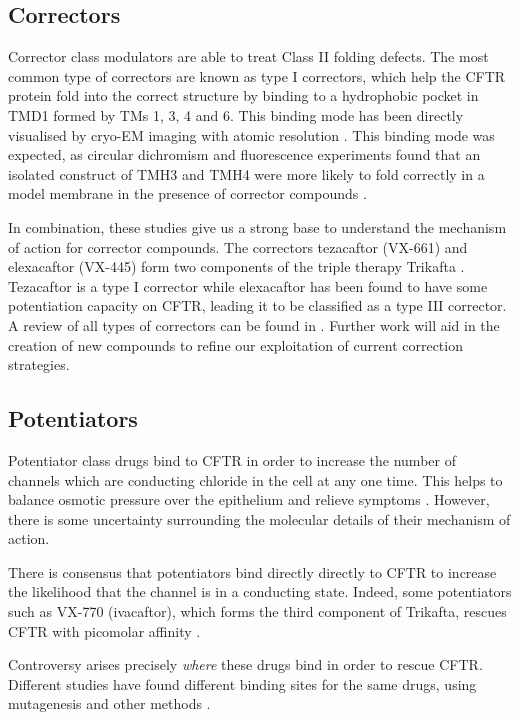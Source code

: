 \subsection{Correctors}
Corrector class modulators are able to treat Class II folding defects. The most common type of correctors are known as type I correctors, which help the CFTR protein fold into the correct structure by binding to a hydrophobic pocket in TMD1 formed by TMs 1, 3, 4 and 6. This binding mode has been directly visualised by cryo-EM imaging with atomic resolution \cite{fiedorczuk2022}. This binding mode was expected, as circular dichromism \cite{greenfield2006} and fluorescence experiments found that an isolated construct of TMH3 and TMH4 were more likely to fold correctly in a model membrane in the presence of corrector compounds \cite{krainer2018}. 

In combination, these studies give us a strong base to understand the mechanism of action for corrector compounds. The correctors tezacaftor (VX-661) and elexacaftor (VX-445) form two components of the triple therapy Trikafta \cite{administration2021, trikafta_website}. Tezacaftor is a type I corrector while elexacaftor has been found to have some potentiation capacity on CFTR, leading it to be classified as a type III corrector. A review of all types of correctors can be found in \cite{veit2018}. Further work will aid in the creation of new compounds to refine our exploitation of current correction strategies.

\subsection{Potentiators}
Potentiator class drugs bind to CFTR in order to increase the number of channels which are conducting chloride in the cell at any one time. This helps to balance osmotic pressure over the epithelium and relieve symptoms \cite{fda_kalydeco_2_years_or_older, fda_kalydeco_approval, jih2013,yeh2017}. However, there is some uncertainty surrounding the molecular details of their mechanism of action. 

There is consensus that potentiators bind directly directly to CFTR to increase the likelihood that the channel is in a conducting state. Indeed, some potentiators such as VX-770 (ivacaftor), which forms the third component of Trikafta, rescues CFTR with picomolar affinity \cite{csanady2019}. 

Controversy arises precisely \textit{where} these drugs bind in order to rescue CFTR. Different studies have found different binding sites for the same drugs, using mutagenesis and other methods \cite{yeh2019, liu2019, laselva2021}.  

